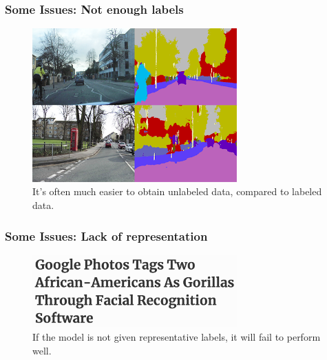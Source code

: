 \documentclass[10pt,mathserif]{beamer}
\begin{document}
\begin{frame}
  \frametitle{Some Issues: Not enough labels}
  \begin{figure}[ht]
    \centering
    \includegraphics[width=0.7\textwidth]{figures/segmentation_labels}
    \caption{It's often much easier to obtain unlabeled data, compared to
      labeled data. \label{fig:label} }
  \end{figure}

\end{frame}

\begin{frame}
  \frametitle{Some Issues: Lack of representation}
\begin{figure}[ht]
  \centering
  \includegraphics[width=0.7\textwidth]{figures/unrepresentative}
  \caption{If the model is not given representative labels, it will fail to
    perform well. \label{fig:label} }
\end{figure}
\end{frame}
\end{document}

